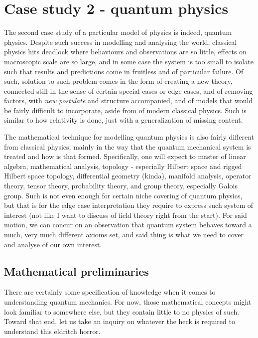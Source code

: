 \chapter{Case study 2 - quantum physics}

The second case study of a particular model of physics is indeed, quantum physics. Despite such success in modelling and analysing the world, classical physics hits deadlock where behaviours and observations are so little, effects on macroscopic scale are so large, and in some case the system is too small to isolate such that results and predictions come in fruitless and of particular failure. Of such, solution to such problem comes in the form of creating a new theory, connected still in the sense of certain special cases or edge cases, and of removing factors, with \textit{new postulate} and structure accompanied, and of models that would be fairly difficult to incorporate, aside from of modern classical physics. Such is similar to how relativity is done, just with a generalization of missing content. 

The mathematical technique for modelling quantum physics is also fairly different from classical physics, mainly in the way that the quantum mechanical system is treated and how is that formed. Specifically, one will expect to master of linear algebra, mathematical analysis, topology - especially Hilbert space and rigged Hilbert space topology, differential geometry (kinda), manifold analysis, operator theory, tensor theory, probability theory, and group theory, especially Galois group. Such is not even enough for certain niche covering of quantum physics, but that is for the edge case interpretation they require to express such system of interest (not like I want to discuss of field theory right from the start). For said motion, we can concur on an observation that quantum system behaves toward a much, very much different axioms set, and said thing is what we need to cover and analyse of our own interest. 

\section{Mathematical preliminaries}

There are certainly some specification of knowledge when it comes to understanding quantum mechanics. For now, those mathematical concepts might look familiar to somewhere else, but they contain little to no physics of such. Toward that end, let us take an inquiry on whatever the heck is required to understand this eldritch horror.
